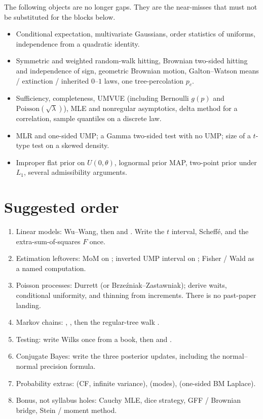 The following objects are no longer gaps. They are the near-misses that must not be substituted for the blocks below.

\begin{itemize}
    \item Conditional expectation, multivariate Gaussians, order statistics of uniforms, independence from a quadratic identity.
    \item Symmetric and weighted random-walk hitting, Brownian two-sided hitting and independence of sign, geometric Brownian motion, Galton--Watson means / extinction / inherited \(0\)--\(1\) laws, one tree-percolation \(p_{c}\).
    \item Sufficiency, completeness, UMVUE (including Bernoulli \(g(p)\) and \(\mathrm{Poisson}(\sqrt{\lambda})\)), MLE and nonregular asymptotics, delta method for a correlation, sample quantiles on a discrete law.
    \item MLR and one-sided UMP; a Gamma two-sided test with no UMP; size of a \(t\)-type test on a skewed density.
    \item Improper flat prior on \(U(0,\theta)\), lognormal prior MAP, two-point prior under \(L_{1}\), several admissibility arguments.
\end{itemize}

\section{Suggested order}
\label{sec:order}

\begin{enumerate}
    \item Linear models: Wu--Wang, then  and . Write the \(t\) interval, Scheff\'e, and the extra-sum-of-squares \(F\) once.
    \item Estimation leftovers: MoM on ; inverted UMP interval on ; Fisher / Wald as a named computation.
    \item Poisson processes: Durrett (or Brze\'zniak--Zastawniak); derive waits, conditional uniformity, and thinning from increments. There is no past-paper landing.
    \item Markov chains: , , then the regular-tree walk .
    \item Testing: write Wilks once from a book, then  and .
    \item Conjugate Bayes: write the three posterior updates, including the normal--normal precision formula.
    \item Probability extras:  (CF, infinite variance),  (modes),  (one-sided BM Laplace).
    \item Bonus, not syllabus holes: Cauchy MLE, dice strategy, GFF / Brownian bridge, Stein / moment method.
\end{enumerate}
